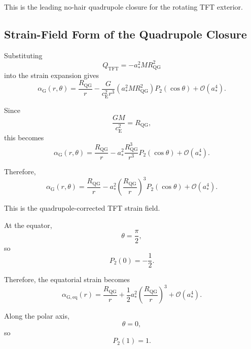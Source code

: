 This is the leading no-hair quadrupole closure for the rotating TFT exterior.

\subsection{Strain-Field Form of the Quadrupole Closure}

Substituting
\begin{equation}
    Q_{\mathrm{TFT}} = -a_\ast^2M R_{\mathrm{QG}}^2
\end{equation}
into the strain expansion gives
\begin{equation}
    \alpha_{\mathrm{G}}(r,\theta) = \frac{R_{\mathrm{QG}}}{r} - \frac{G}{c_{\mathrm{E}}^2r^3} \left( a_\ast^2M R_{\mathrm{QG}}^2 \right) P_2(\cos\theta) + \mathcal{O}(a_\ast^4).
\end{equation}

Since
\begin{equation}
    \frac{GM}{c_{\mathrm{E}}^2} = R_{\mathrm{QG}},
\end{equation}
this becomes
\begin{equation}
    \alpha_{\mathrm{G}}(r,\theta) = \frac{R_{\mathrm{QG}}}{r} - a_\ast^2 \frac{R_{\mathrm{QG}}^3}{r^3} P_2(\cos\theta) + \mathcal{O}(a_\ast^4).
\end{equation}

Therefore,
\begin{equation}
    \boxed{ \alpha_{\mathrm{G}}(r,\theta) = \frac{R_{\mathrm{QG}}}{r} - a_\ast^2 \left( \frac{R_{\mathrm{QG}}}{r} \right)^3 P_2(\cos\theta) + \mathcal{O}(a_\ast^4). }
\end{equation}

This is the quadrupole-corrected TFT strain field.

At the equator,
\begin{equation}
    \theta = \frac{\pi}{2},
\end{equation}
so
\begin{equation}
    P_2(0) = -\frac{1}{2}.
\end{equation}

Therefore, the equatorial strain becomes
\begin{equation}
    \boxed{ \alpha_{\mathrm{G},\mathrm{eq}}(r) = \frac{R_{\mathrm{QG}}}{r} + \frac{1}{2} a_\ast^2 \left( \frac{R_{\mathrm{QG}}}{r} \right)^3 + \mathcal{O}(a_\ast^4). }
\end{equation}

Along the polar axis,
\begin{equation}
    \theta = 0,
\end{equation}
so
\begin{equation}
    P_2(1) = 1.
\end{equation}

